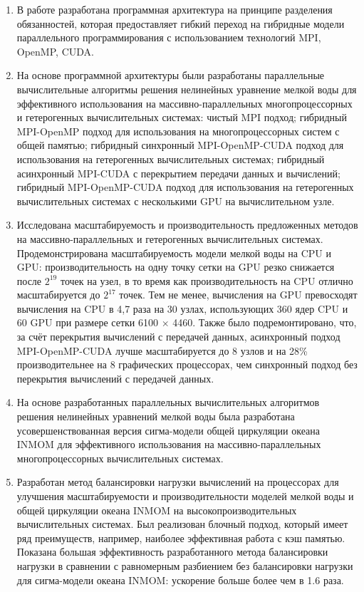 \begin{enumerate}
\item В работе разработана программная архитектура на принципе разделения обязанностей, которая предоставляет гибкий переход на гибридные модели параллельного программирования с использованием технологий MPI, OpenMP, CUDA.
\item На основе программной архитектуры были разработаны параллельные вычислительные алгоритмы решения нелинейных уравнение мелкой воды для эффективного использования на массивно-параллельных многопроцессорных и гетерогенных вычислительных системах:
чистый MPI подход;
гибридный MPI-OpenMP подход для использования на многопроцессорных систем с общей памя­тью;
гибридный синхронный MPI-OpenMP-CUDA подход для использования на гетерогенных вычислительных системах;
гибридный асинхронный MPI-CUDA с перекрытием передачи данных и вычислений;
гибридный MPI-OpenMP-CUDA подход для использования на гетерогенных вычислительных системах с несколькими GPU на вычислительном узле.
\item Исследована масштабируемость и производительность предложенных методов на массивно-параллельных и гетерогенных вычислительных системах. Продемонстрирована масштабируемость модели мелкой воды на CPU и GPU: производительность на одну точку сетки на GPU резко снижается после $2^{19}$ точек на узел, в то время как производительность на CPU отлично масштабируется до $2^{17}$ точек. Тем не менее, вычисления на GPU превосходят вычисления на CPU в 4,7 раза на 30 узлах, использующих 360 ядер CPU и 60 GPU при размере сетки 6100 $\times$ 4460. Также было подремонтировано, что, за счёт перекрытия вычислений с передачей данных, асинхронный подход MPI-OpenMP-CUDA лучше масштабируется до 8 узлов и на 28\% производительнее на 8 графических процессорах, чем синхронный подход без перекрытия вычислений с передачей данных.
\item На основе разработанных параллельных вычислительных алгоритмов решения нелинейных уравнений мелкой воды была разработана усовершенствованная версия сигма-модели общей циркуляции океана INMOM для эффективного использования на массивно-параллельных многопроцессорных вычислительных системах.
\item Разработан метод балансировки нагрузки вычислений на процессорах для улучшения масштабируемости и производительности моделей мелкой воды и общей циркуляции океана INMOM на высокопроизводительных вычислительных системах. Был реализован блочный подход, который имеет ряд преимуществ, например, наиболее эффективная работа с кэш памятью. Показана большая эффективность разработанного метода балансировки нагрузки в сравнении с равномерным разбиением без балансировки нагрузки для сигма-модели океана INMOM: ускорение больше более чем в 1.6 раза.
\end{enumerate}
